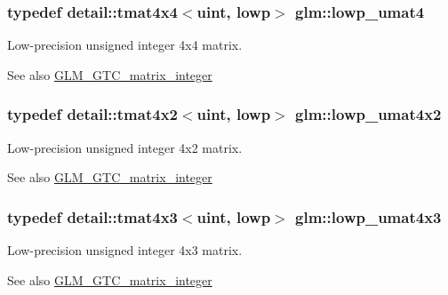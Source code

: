 \subsubsection[{\texorpdfstring{lowp\+\_\+umat4}{lowp_umat4}}]{\setlength{\rightskip}{0pt plus 5cm}typedef detail\+::tmat4x4$<$uint, lowp$>$ {\bf glm\+::lowp\+\_\+umat4}}\hypertarget{group__gtc__matrix__integer_ga571dcc0328ddd1d8c54eba047b5bfa2f}{}\label{group__gtc__matrix__integer_ga571dcc0328ddd1d8c54eba047b5bfa2f}
Low-\/precision unsigned integer 4x4 matrix. \begin{DoxySeeAlso}{See also}
\hyperlink{group__gtc__matrix__integer}{G\+L\+M\+\_\+\+G\+T\+C\+\_\+matrix\+\_\+integer} 
\end{DoxySeeAlso}
\subsubsection[{\texorpdfstring{lowp\+\_\+umat4x2}{lowp_umat4x2}}]{\setlength{\rightskip}{0pt plus 5cm}typedef detail\+::tmat4x2$<$uint, lowp$>$ {\bf glm\+::lowp\+\_\+umat4x2}}\hypertarget{group__gtc__matrix__integer_ga7583563f93096623d54ec8fddd806d13}{}\label{group__gtc__matrix__integer_ga7583563f93096623d54ec8fddd806d13}
Low-\/precision unsigned integer 4x2 matrix. \begin{DoxySeeAlso}{See also}
\hyperlink{group__gtc__matrix__integer}{G\+L\+M\+\_\+\+G\+T\+C\+\_\+matrix\+\_\+integer} 
\end{DoxySeeAlso}
\subsubsection[{\texorpdfstring{lowp\+\_\+umat4x3}{lowp_umat4x3}}]{\setlength{\rightskip}{0pt plus 5cm}typedef detail\+::tmat4x3$<$uint, lowp$>$ {\bf glm\+::lowp\+\_\+umat4x3}}\hypertarget{group__gtc__matrix__integer_ga03af6e7ea92be81959305fc89a239cf5}{}\label{group__gtc__matrix__integer_ga03af6e7ea92be81959305fc89a239cf5}
Low-\/precision unsigned integer 4x3 matrix. \begin{DoxySeeAlso}{See also}
\hyperlink{group__gtc__matrix__integer}{G\+L\+M\+\_\+\+G\+T\+C\+\_\+matrix\+\_\+integer} 
\end{DoxySeeAlso}
